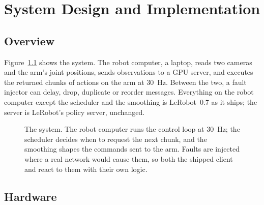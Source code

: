 \chapter{System Design and Implementation}\label{ch:system}

\section{Overview}

Figure~\ref{fig:architecture} shows the system. The robot computer, a laptop, reads two cameras and the arm's joint
positions, sends observations to a GPU server, and executes the returned chunks of actions on the arm at 30~Hz. Between
the two, a fault injector can delay, drop, duplicate or reorder messages. Everything on the robot computer except the
scheduler and the smoothing is LeRobot~0.7 as it ships; the server is LeRobot's policy server, unchanged.

\begin{figure}[htbp]
  \centering
  
  \caption{The system. The robot computer runs the control loop at 30~Hz; the scheduler decides when to request the
           next chunk, and the smoothing shapes the commands sent to the arm. Faults are injected where a real network
           would cause them, so both the shipped client and \drtc{} react to them with their own logic.}
  \label{fig:architecture}
\end{figure}

\section{Hardware}\label{sec:hardware}

